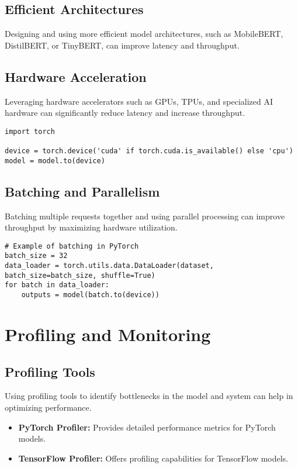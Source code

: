 \subsection{Efficient Architectures}
Designing and using more efficient model architectures, such as MobileBERT, DistilBERT, or TinyBERT, can improve latency and throughput.

\subsection{Hardware Acceleration}
Leveraging hardware accelerators such as GPUs, TPUs, and specialized AI hardware can significantly reduce latency and increase throughput.

\begin{verbatim}
import torch

device = torch.device('cuda' if torch.cuda.is_available() else 'cpu')
model = model.to(device)
\end{verbatim}

\subsection{Batching and Parallelism}
Batching multiple requests together and using parallel processing can improve throughput by maximizing hardware utilization.

\begin{verbatim}
# Example of batching in PyTorch
batch_size = 32
data_loader = torch.utils.data.DataLoader(dataset, batch_size=batch_size, shuffle=True)
for batch in data_loader:
    outputs = model(batch.to(device))
\end{verbatim}

\section{Profiling and Monitoring}

\subsection{Profiling Tools}
Using profiling tools to identify bottlenecks in the model and system can help in optimizing performance.

\begin{itemize}
    \item \textbf{PyTorch Profiler:} Provides detailed performance metrics for PyTorch models.
    \item \textbf{TensorFlow Profiler:} Offers profiling capabilities for TensorFlow models.
\end{itemize}

